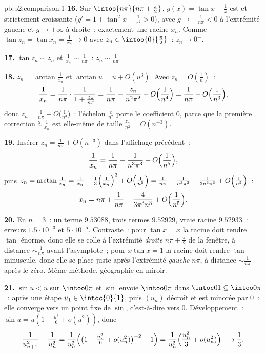 \begin{solution}{pb:b2:comparison:1}
\textbf{16.} Sur $\intoo{n\pi}{n\pi + \frac\pi2}$, $g(x) = \tan
x - \frac1x$ est  et strictement croissante ($g' = 1 +
\tan^2x + \frac1{x^2} > 0$), avec $g \to -\frac1{n\pi} < 0$ à
l'extrémité gauche et $g \to +\infty$ à droite~: exactement une
racine $x_n$. Comme $\tan z_n = \tan x_n = \frac1{x_n} \to 0$
avec $z_n \in \intoo{0}{\frac\pi2}$~: $z_n \to 0^+$.

\textbf{17.} $\tan z_n \sim z_n$ et $\frac1{x_n} \sim
\frac1{n\pi}$~: $z_n \sim \frac1{n\pi}$.

\textbf{18.} $z_n = \arctan\frac1{x_n}$ et $\arctan u = u +
O(u^3)$. Avec $z_n = O(\frac1n)$~:
\[
\frac1{x_n} = \frac{1}{n\pi}\cdot\frac1{1 + \frac{z_n}{n\pi}}
= \frac1{n\pi} - \frac{z_n}{n^2\pi^2} +
O\Bigl(\frac1{n^4}\Bigr)
= \frac1{n\pi} + O\Bigl(\frac1{n^3}\Bigr),
\]
donc $z_n = \frac1{n\pi} + O\bigl(\frac1{n^3}\bigr)$~: l'échelon
$\frac{c}{n^2}$ porte le coefficient $0$, parce que la
première correction à $\frac1{x_n}$ est elle-même de taille
$\frac{z_n}{n^2} = O(n^{-3})$.

\textbf{19.} Insérer $z_n = \frac1{n\pi} + O(n^{-3})$ dans
l'affichage précédent~:
\[
\frac{1}{x_n} = \frac{1}{n\pi} - \frac{1}{n^3\pi^3} +
O\Bigl(\frac1{n^5}\Bigr),
\]
puis $z_n = \arctan\frac1{x_n} = \frac1{x_n} -
\frac{1}{3}\Bigl(\frac1{x_n}\Bigr)^3 + O\Bigl(\frac1{n^5}\Bigr)
= \frac1{n\pi} - \frac{1}{n^3\pi^3} - \frac{1}{3n^3\pi^3} +
O\Bigl(\frac1{n^5}\Bigr)$~:
\[
x_n = n\pi + \frac{1}{n\pi} - \frac{4}{3\pi^3n^3} +
O\Bigl(\frac1{n^5}\Bigr).
\]

\textbf{20.} En $n = 3$~: un terme $9.53088$, trois termes
$9.52929$, vraie racine $9.52933$~: erreurs $1.5\cdot10^{-3}$ et
$5\cdot10^{-5}$. Contraste~: pour $\tan x = x$ la racine doit rendre
$\tan$ énorme, donc elle se colle à l'extrémité \emph{droite} $n\pi +
\frac\pi2$ de la fenêtre, à distance $\sim\frac1{n\pi}$
avant l'asymptote~; pour $x\tan x = 1$ la racine doit rendre
$\tan$ minuscule, donc elle se place juste après l'extrémité
\emph{gauche} $n\pi$, à distance $\sim\frac1{n\pi}$ après le zéro.
Même méthode, géographie en miroir.

\textbf{21.} $\sin u < u$ sur $\intoo0\pi$ et $\sin$ envoie
$\intoo0\pi$ dans $\intoc01 \subseteq \intoo0\pi$~: après une
étape $u_1 \in \intoc{0}{1}$, puis $(u_n)$ décroît et est
minorée par $0$~: elle converge vers un point fixe de $\sin$,
c'est-à-dire vers $0$. Développement~: $\sin u = u(1 - \frac{u^2}6 +
o(u^2))$, donc
\[
\frac{1}{u_{n+1}^2} - \frac1{u_n^2}
= \frac{1}{u_n^2}\Bigl(\bigl(1 - \tfrac{u_n^2}6 +
o(u_n^2)\bigr)^{-2} - 1\Bigr)
= \frac{1}{u_n^2}\Bigl(\frac{u_n^2}{3} + o(u_n^2)\Bigr)
\longrightarrow \frac13 .
\]


\end{solution}
